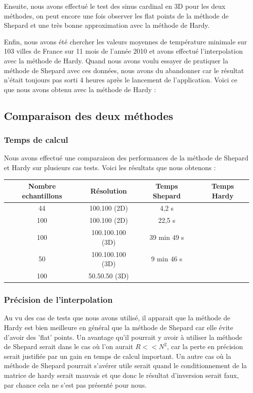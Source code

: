 \documentclass[a4paper,9pt]{article}
\begin{document}
Ensuite, nous avons effectué le test des sinus cardinal en 3D pour les deux méthodes, on peut encore une fois observer les flat points de la méthode de Shepard et une très bonne approximation avec la méthode de Hardy.

Enfin, nous avons été chercher les valeurs moyennes de température minimale sur 103 villes de France sur 11 mois de l'année 2010 et avons effectué l'interpolation avec la méthode de Hardy. Quand nous avons voulu essayer de pratiquer la méthode de Shepard avec ces données, nous avons du abandonner car le résultat n'était toujours pas sorti 4 heures après le lancement de l'application. Voici ce que nous avons obtenu avec la méthode de Hardy :

\subsection{Comparaison des deux méthodes}
\label{subsec:comparaison_methodes}

\subsubsection{Temps de calcul}
\label{subsec:temps_calcul}
Nous avons effectué une comparaison des performances de la méthode de Shepard et Hardy sur plusieurs cas tests. Voici les résultats que nous obtenons :

\begin{tabular}{|c|c|c|c|}
\hline
Nombre echantillons & Résolution & Temps Shepard & Temps Hardy \\
\hline
44 & 100.100 (2D) & 4,2 s & \\
100 & 100.100 (2D) & 22,5 s & \\
100 & 100.100.100 (3D) & 39 min 49 s & \\
50 & 100.100.100 (3D) & 9 min 46 s& \\
100 & 50.50.50 (3D) & & \\
\hline
\end{tabular}

\subsubsection{Précision de l'interpolation}
\label{subsec:precision_interpolation}
Au vu des cas de tests que nous avons utilisé, il apparait que la méthode de Hardy est bien meilleure en général que la méthode de Shepard car elle évite d'avoir des 'flat' points. Un avantage qu'il pourrait y avoir à utiliser la méthode de Shepard serait dans le cas où l'on aurait $R<<N^{2}$, car la perte en précision serait justifiée par un gain en temps de calcul important. Un autre cas où la méthode de Shepard pourrait s'avérer utile serait quand le conditionnement de la matrice de hardy serait mauvais et que donc le résultat d'inversion serait faux, par chance cela ne s'est pas présenté pour nous.
\end{document}
